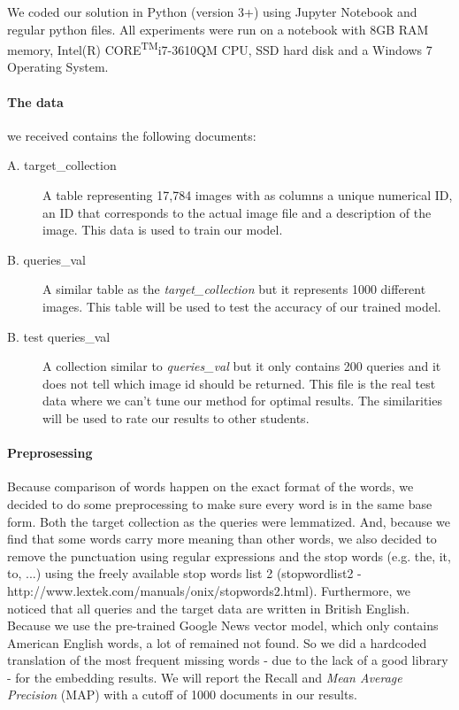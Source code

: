 We coded our solution in Python (version 3+) using Jupyter Notebook and regular python files. All experiments were run on a notebook with 8GB RAM memory, Intel(R) CORE\textsuperscript{TM}i7-3610QM CPU, SSD hard disk and a Windows 7 Operating System.

\paragraph{The data}
we received contains the following documents:
\begin{description}
	\item[A. target\_collection] A table representing 17,784 images with as columns a unique numerical ID, an ID that corresponds to the actual image file and a description of the image. This data is used to train our model.
	\item[B. queries\_val] A similar table as the \textit{target\_collection} but it represents 1000 different images. This table will be used to test the accuracy of our trained model.
	\item[B. test queries\_val] A collection similar to \textit{queries\_val} but it only contains 200 queries and it does not tell which image id should be returned. This file is the real test data where we can't tune our method for optimal results. The similarities will be used to rate our results to other students.
\end{description}

\paragraph{Preprosessing}
Because comparison of words happen on the exact format of the words, we decided to do some preprocessing to make sure every word is in the same base form. Both the target collection as the queries were lemmatized. And, because we find that some words carry more meaning than other words, we also decided to remove the punctuation using regular expressions and the stop words (e.g. the, it, to, ...) using the freely available stop words list 2 (stopwordlist2 - http://www.lextek.com/manuals/onix/stopwords2.html).
\newline
\newline
Furthermore, we noticed that all queries and the target data are written in British English. Because we use the pre-trained Google News vector model, which only contains American English words, a lot of remained not found. So we did a hardcoded translation of the most frequent missing words - due to the lack of a good library - for the embedding results.
\newline
\newline
We will report the Recall and \textit{Mean Average Precision} (MAP) with a cutoff of 1000 documents in our results.